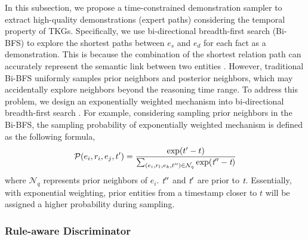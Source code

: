 \documentclass[sigconf,natbib=true]{acmart}
\begin{document}
In this subsection, we propose a time-constrained demonstration sampler to extract high-quality demonstrations (expert paths) considering the temporal property of TKGs. Specifically, we use bi-directional breadth-first search (Bi-BFS) to explore the shortest paths between  $e_s$ and  $e_d$ for each fact as a  demonstration. %
This is because the combination of the shortest relation path can accurately represent the semantic link between two entities \cite{DeepPath, MultiHop, kgr_survey}. However, traditional Bi-BFS uniformly samples prior neighbors and posterior neighbors, which may accidentally explore  neighbors beyond the reasoning time range. To address this problem, we design an exponentially weighted mechanism into bi-directional breadth-first search . For example, considering sampling prior neighbors in the Bi-BFS, the sampling probability of exponentially weighted mechanism is defined  as the following formula,
 \begin{equation}
 	\mathcal{P}(e_{i}, r_i, e_j, t') =  \frac{\rm{exp}(\emph{$t' - t$})}{\sum\nolimits_{(e_i, r_l, e_k, t'') \in \mathcal{N}_q}\rm{exp}(\emph{t}''-\emph{t})}
 \end{equation}
where $\mathcal{N}_q$ represents prior neighbors of $e_i$. $\emph{t}''$ and $\emph{t}'$ are prior to $\emph{t}$. Essentially, with exponential weighting, prior entities from a timestamp closer to $t$ will be assigned a higher probability during sampling. %


\subsubsection{Rule-aware Discriminator}

\end{document}
